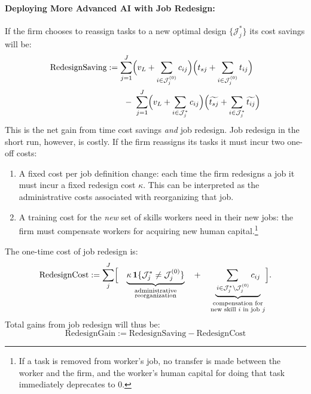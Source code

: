 \documentclass{article}
\theoremstyle{plain}
\theoremstyle{plain}
\begin{document}
\paragraph{Deploying More Advanced AI with Job Redesign:}
If the firm chooses to reassign tasks to a new optimal design \(\{\mathcal{J}_j^*\}\) its cost savings will be:
\begin{align}
\label{eq:job_redesign_saving}
\text{RedesignSaving}
&:=
\sum_{j=1}^{J}
\Bigl(v_L + \sum_{i\in\mathcal{J}_j^{(0)}}c_{ij}\Bigr)
\Bigl(t_{sj} + \sum_{i\in\mathcal{J}_j^{(0)}}t_{ij}\Bigr)
\\
& \qquad
-\;
\sum_{j=1}^{J}
\Bigl(v_L + \sum_{i\in\mathcal{J}_j^*}c_{ij}\Bigr)
\Bigl(\widetilde{t_{sj}} + \sum_{i\in\mathcal{J}_j^*}\widetilde{t_{ij}}\Bigr) \nonumber
\end{align}
This is the net gain from time cost savings \emph{and} job redesign.
Job redesign in the short run, however, is costly.
If the firm reassigns its tasks it must incur two one-off costs:
\begin{enumerate}
\item A fixed cost per job definition change: each time the firm redesigns a job it must incur a fixed redesign cost $\kappa$.
This can be interpreted as the administrative costs associated with reorganizing that job.
\item A training cost for the \emph{new} set of skills workers need in their new jobs: the firm must compensate workers for acquiring new human capital.\footnote{If a task is removed from worker's job, no transfer is made between the worker and the firm, and the worker's human capital for doing that task immediately deprecates to 0.}
\end{enumerate}
The one-time cost of job redesign is:
\begin{equation}
\label{eq:job_redesign_cost}
\text{RedesignCost}
:=
\sum_{j}^{J}\Bigl[
\quad
\underbrace{\kappa\,\mathbf1\{\mathcal{J}_j^*\neq\mathcal{J}_j^{(0)}\}}_{\substack{\text{administrative}\\\text{reorganization}}}
\quad+\quad
\underbrace{\sum_{\,i\in\mathcal{J}_j^*\setminus\mathcal{J}_j^{(0)}}c_{ij}}_{\substack{\text{compensation for}\\\text{new skill $i$ in job $j$}}}
\Bigr].
\end{equation}
Total gains from job redesign will thus be:
\begin{equation}
\label{eq:job_redesign_gain}
\text{RedesignGain}
:=
\text{RedesignSaving} - \text{RedesignCost}
\end{equation}
\end{document}
